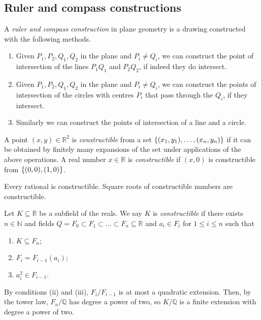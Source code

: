 \subsection{Ruler and compass constructions}
\begin{definition}
	A \emph{ruler and compass construction} in plane geometry is a drawing constructed with the following methods.
	\begin{enumerate}
		\item Given \( P_1, P_2, Q_1, Q_2 \) in the plane and \( P_i \neq Q_i \), we can construct the point of intersection of the lines \( P_1Q_1 \) and \( P_2Q_2 \), if indeed they do intersect.
		\item Given \( P_1, P_2, Q_1, Q_2 \) in the plane and \( P_i \neq Q_i \), we can construct the points of intersection of the circles with centres \( P_i \) that pass through the \( Q_i \), if they intersect.
		\item Similarly we can construct the points of intersection of a line and a circle.
	\end{enumerate}
	A point \( (x,y) \in \mathbb R^2 \) is \emph{constructible} from a set \( \qty{(x_1, y_1), \dots, (x_n, y_n)} \) if it can be obtained by finitely many expansions of the set under applications of the above operations.
	A real number \( x \in \mathbb R \) is \emph{constructible} if \( (x,0) \) is constructible from \( \qty{(0,0), (1,0)} \).
\end{definition}
\begin{remark}
	Every rational is constructible.
	Square roots of constructible numbers are constructible.
\end{remark}
\begin{definition}
	Let \( K \subseteq \mathbb R \) be a subfield of the reals.
	We say \( K \) is \emph{constructible} if there exists \( n \in \mathbb N \) and fields \( Q = F_0 \subset F_1 \subset \dots \subset F_n \subseteq \mathbb R \) and \( a_i \in F_i \) for \( 1 \leq i \leq n \) such that
	\begin{enumerate}
		\item \( K \subseteq F_n \);
		\item \( F_i = F_{i-1}(a_i) \);
		\item \( a_i^2 \in F_{i-1} \).
	\end{enumerate}
\end{definition}
\begin{remark}
	By conditions (ii) and (iii), \( F_i / F_{i-1} \) is at most a quadratic extension.
	Then, by the tower law, \( F_n / \mathbb Q \) has degree a power of two, so \( K / \mathbb Q \) is a finite extension with degree a power of two.
\end{remark}
